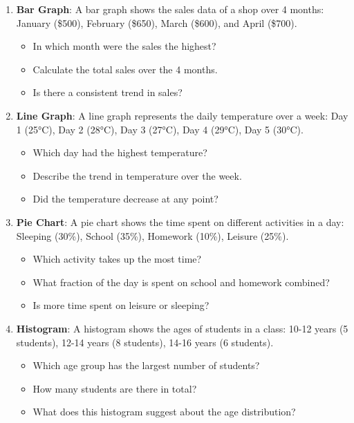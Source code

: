 \begin{enumerate}
    \item \textbf{Bar Graph}: A bar graph shows the sales data of a shop over 4 months: January (\$500), February (\$650), March (\$600), and April (\$700).
    \begin{itemize}
        \item In which month were the sales the highest?
        \item Calculate the total sales over the 4 months.
        \item Is there a consistent trend in sales?
    \end{itemize}

    \item \textbf{Line Graph}: A line graph represents the daily temperature over a week: Day 1 (25°C), Day 2 (28°C), Day 3 (27°C), Day 4 (29°C), Day 5 (30°C).
    \begin{itemize}
        \item Which day had the highest temperature?
        \item Describe the trend in temperature over the week.
        \item Did the temperature decrease at any point?
    \end{itemize}

    \item \textbf{Pie Chart}: A pie chart shows the time spent on different activities in a day: Sleeping (30\%), School (35\%), Homework (10\%), Leisure (25\%).
    \begin{itemize}
        \item Which activity takes up the most time?
        \item What fraction of the day is spent on school and homework combined?
        \item Is more time spent on leisure or sleeping?
    \end{itemize}

    \item \textbf{Histogram}: A histogram shows the ages of students in a class: 10-12 years (5 students), 12-14 years (8 students), 14-16 years (6 students).
    \begin{itemize}
        \item Which age group has the largest number of students?
        \item How many students are there in total?
        \item What does this histogram suggest about the age distribution?
    \end{itemize}


\end{enumerate}
